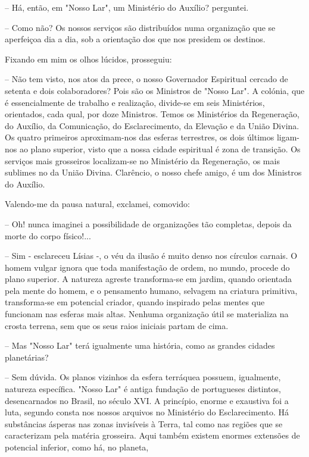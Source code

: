 \documentclass[portuguese,12pt,a4paper]{scrbook}
\begin{document}
	– Há, então, em "Nosso Lar", um Ministério do Auxílio? perguntei.
	
	– Como não? Os nossos serviços são distribuídos numa organização que se aperfeiçoa dia a dia, sob a orientação dos que nos presidem os destinos.
	
	Fixando em mim os olhos lúcidos, prosseguiu:
	
	– Não tem visto, nos atos da prece, o nosso Governador Espiritual cercado de setenta e dois colaboradores? Pois são os Ministros de "Nosso Lar". A colónia, que é essencialmente de trabalho e realização, divide-se em seis Ministérios, orientados, cada qual, por doze Ministros. Temos os Ministérios da Regeneração, do Auxílio, da Comunicação, do Esclarecimento, da Elevação e da União Divina. Os quatro primeiros aproximam-nos das esferas terrestres, os dois últimos ligam-nos ao plano superior, visto que a nossa cidade espiritual é zona de transição. Os serviços mais grosseiros localizam-se no Ministério da Regeneração, os mais sublimes no da União Divina. Clarêncio, o nosso chefe amigo, é um dos Ministros do Auxílio.
	
	Valendo-me da pausa natural, exclamei, comovido:
	
	– Oh! nunca imaginei a possibilidade de organizações tão completas, depois da morte do corpo físico!...
	
	– Sim - esclareceu Lísias -, o véu da ilusão é muito denso nos círculos carnais. O homem vulgar ignora que toda manifestação de ordem, no mundo, procede do plano superior. A natureza agreste transforma-se em jardim, quando orientada pela mente do homem, e o pensamento humano, selvagem na criatura primitiva, transforma-se em potencial criador, quando inspirado pelas mentes que funcionam nas esferas mais altas. Nenhuma organização útil se materializa na crosta terrena, sem que os seus raios iniciais partam de cima.
	
	– Mas "Nosso Lar" terá igualmente uma história, como as grandes cidades planetárias?
	
	– Sem dúvida. Os planos vizinhos da esfera terráquea possuem, igualmente, natureza específica. "Nosso Lar" é antiga fundação de portugueses distintos, desencarnados no Brasil, no século XVI. A princípio, enorme e exaustiva foi a luta, segundo consta nos nossos arquivos no Ministério do Esclarecimento. Há substâncias ásperas nas zonas invisíveis à Terra, tal como nas regiões que se caracterizam pela matéria grosseira. Aqui também existem enormes extensões de potencial inferior, como há, no planeta,
	
\end{document}
